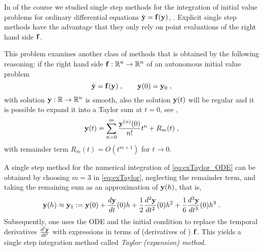 
\begin{problem} \label{prb:TaylorODE}
 
In  of the course we studied single step methods for the integration of initial value problems for ordinary differential equations $\dot{{\mathbf{y}}}={\mathbf{f}}({\mathbf{y}})$, .
Explicit single step methods have the advantage that they only rely on point evaluations of the right hand side ${\mathbf{f}}$.

  This problem examines another class of methods that is obtained by
  the following reasoning: if the right hand side
  ${\mathbf{f}}:\mathbb{R}^n\to\mathbb{R}^n$ of an autonomous initial value problem
  \begin{equation}    \label{eq:exTaylor_ODE}
    \dot{{\mathbf{y}}} = {\mathbf{f}}({\mathbf{y}})\;, \qquad {\mathbf{y}}(0)={\mathbf{y}}_0\;,
  \end{equation}
  with solution ${\mathbf{y}}:\mathbb{R}\rightarrow\mathbb{R}^n$ is smooth, also the solution ${\mathbf{y}}(t)$ will be regular and it is possible to expand it
  into a Taylor sum at $t=0$, see ,
  \begin{equation}
    \label{eq:exTaylor}
    {\mathbf{y}}(t) = \sum\limits_{n=0}^m \frac{{\mathbf{y}}^{(n)}(0)}{n!}t^n + R_{m}(t)\;,
  \end{equation}
  with remainder term $R_{m}(t) = O(t^{m+1})$ for $t\to 0$.
  
  A single step method for the numerical integration of \eqref{eq:exTaylor_ODE} can be
  obtained by choosing $m=3$ in \eqref{eq:exTaylor}, neglecting the remainder term, and
  taking the remaining sum as an approximation of ${\mathbf{y}}(h)$, that is,
  \begin{gather*} 
    {\mathbf{y}}(h) \approx {\mathbf{y}}_{1} := {\mathbf{y}}(0) + \frac{d{\mathbf{y}}}{dt}(0)h + 
    \frac{1}{2}\frac{d^{2}{\mathbf{y}}}{dt^{2}}(0)h^{2}
    + \frac{1}{6}\frac{d^{3}{\mathbf{y}}}{dt^{3}}(0)h^{3}\;.
  \end{gather*}
  Subsequently, one uses the ODE and the initial condition to replace
  the temporal derivatives $\frac{d^{l}{\mathbf{y}}}{dt^{l}}$ with expressions
  in terms of (derivatives of ) ${\mathbf{f}}$. This yields a single step 
  integration method called \emph{Taylor (expansion) method}.



\end{problem}
